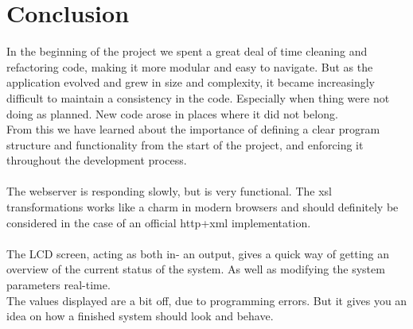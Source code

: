 \chapter{Conclusion}
\label{chap:conclusion}
In the beginning of the project we spent a great deal of time cleaning and refactoring code, making it more modular and easy to navigate. But as the application evolved and grew in size and complexity, it became increasingly difficult to maintain a consistency in the code. Especially when thing were not doing as planned. New code arose in places where it did not belong.\\
From this we have learned about the importance of defining a clear program structure and functionality from the start of the project, and enforcing it throughout the development process.\\\\
The webserver is responding slowly, but is very functional. The xsl transformations works like a charm in modern browsers and should definitely be considered in the case of an official http+xml implementation.\\\\
The LCD screen, acting as both in- an output, gives a quick way of getting an overview of the current status of the system. As well as modifying the system parameters real-time.\\ The values displayed are a bit off, due to programming errors. But it gives you an idea on how a finished system should look and behave.
